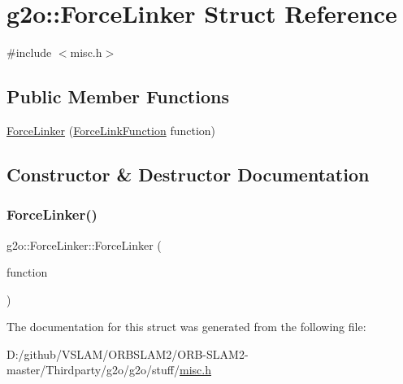 \hypertarget{structg2o_1_1_force_linker}{}\section{g2o\+:\+:Force\+Linker Struct Reference}
\label{structg2o_1_1_force_linker}


{\ttfamily \#include $<$misc.\+h$>$}

\subsection*{Public Member Functions}
\begin{DoxyCompactItemize}
\item 
\mbox{\hyperlink{structg2o_1_1_force_linker_ae5489ea8966a1d1f62471075f1dd2524}{Force\+Linker}} (\mbox{\hyperlink{namespaceg2o_a3be76fea59d320255e89425439f18f48}{Force\+Link\+Function}} function)
\end{DoxyCompactItemize}


\subsection{Constructor \& Destructor Documentation}
\mbox{\label{structg2o_1_1_force_linker_ae5489ea8966a1d1f62471075f1dd2524}} 
\subsubsection{\texorpdfstring{Force\+Linker()}{ForceLinker()}}
{\footnotesize\ttfamily g2o\+::\+Force\+Linker\+::\+Force\+Linker (\begin{DoxyParamCaption}\item[{\mbox{\hyperlink{namespaceg2o_a3be76fea59d320255e89425439f18f48}{Force\+Link\+Function}}}]{function }\end{DoxyParamCaption})\hspace{0.3cm}{\ttfamily [inline]}}



The documentation for this struct was generated from the following file\+:\begin{DoxyCompactItemize}
\item 
D\+:/github/\+V\+S\+L\+A\+M/\+O\+R\+B\+S\+L\+A\+M2/\+O\+R\+B-\/\+S\+L\+A\+M2-\/master/\+Thirdparty/g2o/g2o/stuff/\mbox{\hyperlink{misc_8h}{misc.\+h}}\end{DoxyCompactItemize}
